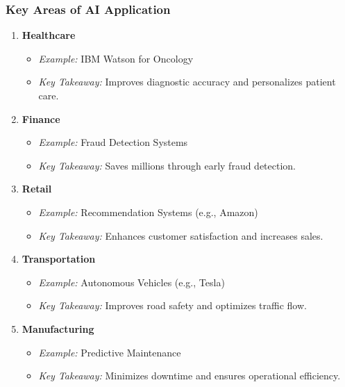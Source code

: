 \documentclass{beamer}
\begin{document}
\begin{frame}[fragile]
    \frametitle{Key Areas of AI Application}
    \begin{enumerate}
        \item \textbf{Healthcare}
            \begin{itemize}
                \item \textit{Example:} IBM Watson for Oncology
                \item \textit{Key Takeaway:} Improves diagnostic accuracy and personalizes patient care.
            \end{itemize}
        \item \textbf{Finance}
            \begin{itemize}
                \item \textit{Example:} Fraud Detection Systems
                \item \textit{Key Takeaway:} Saves millions through early fraud detection.
            \end{itemize}
        \item \textbf{Retail}
            \begin{itemize}
                \item \textit{Example:} Recommendation Systems (e.g., Amazon)
                \item \textit{Key Takeaway:} Enhances customer satisfaction and increases sales.
            \end{itemize}
        \item \textbf{Transportation}
            \begin{itemize}
                \item \textit{Example:} Autonomous Vehicles (e.g., Tesla)
                \item \textit{Key Takeaway:} Improves road safety and optimizes traffic flow.
            \end{itemize}
        \item \textbf{Manufacturing}
            \begin{itemize}
                \item \textit{Example:} Predictive Maintenance
                \item \textit{Key Takeaway:} Minimizes downtime and ensures operational efficiency.
            \end{itemize}
    \end{enumerate}
\end{frame}
\end{document}
